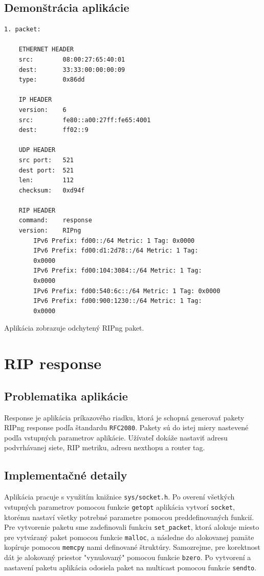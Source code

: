 \documentclass{report}
\begin{document}
    \subsection{Demonštrácia aplikácie}
	
    \begin{lstlisting}[style=DOS]
    1. packet:
    
    ETHERNET HEADER
    src:        08:00:27:65:40:01
    dest:       33:33:00:00:00:09
    type:       0x86dd
    
    IP HEADER
    version:    6
    src:        fe80::a00:27ff:fe65:4001
    dest:       ff02::9
    
    UDP HEADER
    src port:   521
    dest port:  521
    len:        112
    checksum:   0xd94f
    
    RIP HEADER
    command:    response
    version:    RIPng
        IPv6 Prefix: fd00::/64 Metric: 1 Tag: 0x0000
        IPv6 Prefix: fd00:d1:2d78::/64 Metric: 1 Tag:
        0x0000
        IPv6 Prefix: fd00:104:3084::/64 Metric: 1 Tag:
        0x0000
        IPv6 Prefix: fd00:540:6c::/64 Metric: 1 Tag: 0x0000
        IPv6 Prefix: fd00:900:1230::/64 Metric: 1 Tag:
        0x0000
    \end{lstlisting}
    Aplikácia zobrazuje odchytený RIPng paket.

    \newpage

	\section{RIP response}

    \subsection{Problematika aplikácie}
    Response je aplikácia príkazového riadku, ktorá je schopná generovať pakety RIPng response podľa štandardu \verb|RFC2080|. Pakety sú do istej miery nastevené podľa vstupných parametrov aplikácie. Užívateľ dokáže nastaviť adresu podvrhávanej siete, RIP metriku, adresu nexthopu a router tag.
  
	\subsection{Implementačné detaily}
	Aplikácia pracuje s využitím knižnice \verb|sys/socket.h|. Po overení všetkých vstupných parametrov pomocou funkcie \verb|getopt| aplikácia vytvorí \verb|socket|, ktorému nastaví všetky potrebné parametre pomocou preddefinovaných funkcií. Pre vytvorenie paketu sme zadefinovali funkciu \verb|set_packet|, ktorá alokuje miesto pre vytváraný paket pomocou funkcie \verb|malloc|, a následne do alokovanej pamäte kopíruje pomocou \verb|memcpy| nami definované štruktúry. Samozrejme, pre korektnost dát je alokovaný priestor "vynulovaný" pomocou funkcie \verb|bzero|. Po vytvorení a nastavení paketu aplikácia odosiela paket na multicast pomocou funkcie \verb|sendto|.
	
\end{document}
